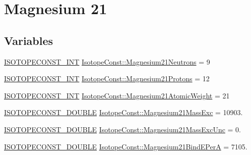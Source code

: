 \hypertarget{group___isotope_const-_magnesium-_mg21}{}\section{Magnesium 21}
\label{group___isotope_const-_magnesium-_mg21}
\subsection*{Variables}
\begin{DoxyCompactItemize}
\item 
\mbox{\hyperlink{group___isotope_const-_macros_ga5f18360b3e99483a35c32d789e62621c}{I\+S\+O\+T\+O\+P\+E\+C\+O\+N\+S\+T\+\_\+\+I\+NT}} \mbox{\hyperlink{group___isotope_const-_magnesium-_mg21_ga0f66a2c09191f9103847cde5e2038afe}{Isotope\+Const\+::\+Magnesium21\+Neutrons}} = 9
\item 
\mbox{\hyperlink{group___isotope_const-_macros_ga5f18360b3e99483a35c32d789e62621c}{I\+S\+O\+T\+O\+P\+E\+C\+O\+N\+S\+T\+\_\+\+I\+NT}} \mbox{\hyperlink{group___isotope_const-_magnesium-_mg21_ga085b8b0971d5c1eb129483cf4bc553dd}{Isotope\+Const\+::\+Magnesium21\+Protons}} = 12
\item 
\mbox{\hyperlink{group___isotope_const-_macros_ga5f18360b3e99483a35c32d789e62621c}{I\+S\+O\+T\+O\+P\+E\+C\+O\+N\+S\+T\+\_\+\+I\+NT}} \mbox{\hyperlink{group___isotope_const-_magnesium-_mg21_ga0c5bedda9f75dab80680adb2667b46f0}{Isotope\+Const\+::\+Magnesium21\+Atomic\+Weight}} = 21
\item 
\mbox{\hyperlink{group___isotope_const-_macros_ga8f45a7272ce02c0b4c65c44636ed719a}{I\+S\+O\+T\+O\+P\+E\+C\+O\+N\+S\+T\+\_\+\+D\+O\+U\+B\+LE}} \mbox{\hyperlink{group___isotope_const-_magnesium-_mg21_ga92495c0a166f4a9167549990d5d01045}{Isotope\+Const\+::\+Magnesium21\+Mass\+Exc}} = 10903.
\item 
\mbox{\hyperlink{group___isotope_const-_macros_ga8f45a7272ce02c0b4c65c44636ed719a}{I\+S\+O\+T\+O\+P\+E\+C\+O\+N\+S\+T\+\_\+\+D\+O\+U\+B\+LE}} \mbox{\hyperlink{group___isotope_const-_magnesium-_mg21_ga511ab36d60d451d95785d67392c11339}{Isotope\+Const\+::\+Magnesium21\+Mass\+Exc\+Unc}} = 0.
\item 
\mbox{\hyperlink{group___isotope_const-_macros_ga8f45a7272ce02c0b4c65c44636ed719a}{I\+S\+O\+T\+O\+P\+E\+C\+O\+N\+S\+T\+\_\+\+D\+O\+U\+B\+LE}} \mbox{\hyperlink{group___isotope_const-_magnesium-_mg21_gafe3089372416f99cdf89669eb18e3466}{Isotope\+Const\+::\+Magnesium21\+Bind\+E\+PerA}} = 7105.
\item 

\end{DoxyCompactItemize}

